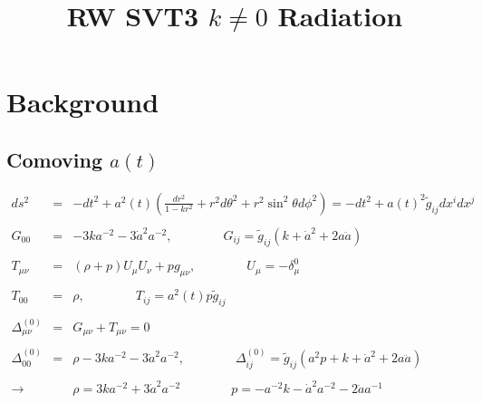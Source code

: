 \documentclass[10pt,letterpaper]{article}
\title{RW SVT3 $k\ne 0$ Radiation}
\date{}
\numberwithin{equation}{section}
\begin{document}
 
\maketitle
\noindent 
\section{Background}

\subsection{Comoving $a(t)$}
\begin{eqnarray}
ds^2 &=& -dt^2 + a^2(t)\left( \frac{dr^2}{1-kr^2} + r^2d\theta^2 + r^2\sin^2\theta d\phi^2\right) = -dt^2 + a(t)^2 \tilde g_{ij} dx^i dx^j
\\ \nonumber\\
G_{00} &=& -3k a^{-2} -3 \dot a^2 a^{-2},\qquad\qquad G_{ij} = \tilde g_{ij}(k + \dot a^2 + 2 a \ddot a)
\\ \nonumber\\
T_{\mu\nu} &=& (\rho+p)U_\mu U_\nu + p g_{\mu\nu},\qquad\qquad U_\mu = -\delta^0_\mu
\\ \nonumber\\
T_{00} &=& \rho,\qquad\qquad T_{ij} = a^2(t)p \tilde g_{ij}
\\ \nonumber\\
\Delta^{(0)}_{\mu\nu} &=& G_{\mu\nu}+ T_{\mu\nu} = 0
\\ \nonumber\\
\Delta^{(0)}_{00} &=& \rho- 3ka^{-2} -3 \dot a^2 a^{-2}, \qquad\qquad
\Delta^{(0)}_{ij} = \tilde g_{ij}( a^2 p +k + \dot a^2 + 2a \ddot a)
\\ \nonumber\\
\to  &&\boxed{\rho= 3k a^{-2} +3 \dot a^2 a^{-2}}
\qquad\qquad \boxed{p= -a^{-2} k - \dot a^2 a^{-2} -2 \ddot a a^{-1}}
\end{eqnarray}


\end{document}
